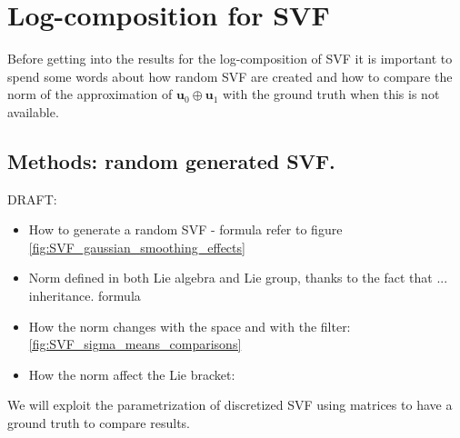 \section{Log-composition for SVF}
Before getting into the results for the log-composition of SVF it is important to spend some words about how random SVF are created and how to compare the norm of the approximation of $\mathbf{u}_0\oplus \mathbf{u}_1$ with the ground truth when this is not available.



\subsection{Methods: random generated SVF.}

DRAFT:
\begin{itemize}
\item How to generate a random SVF - formula refer to figure \ref{fig:SVF_gaussian_smoothing_effects}
\item Norm defined in both Lie algebra and Lie group, thanks to the fact that ... inheritance. formula
\item How the norm changes with the space and with the filter: \ref{fig:SVF_sigma_means_comparisons}
\item How the norm affect the Lie bracket: 
\end{itemize}

We will exploit the parametrization of discretized SVF using matrices to have a ground truth to compare results. 

